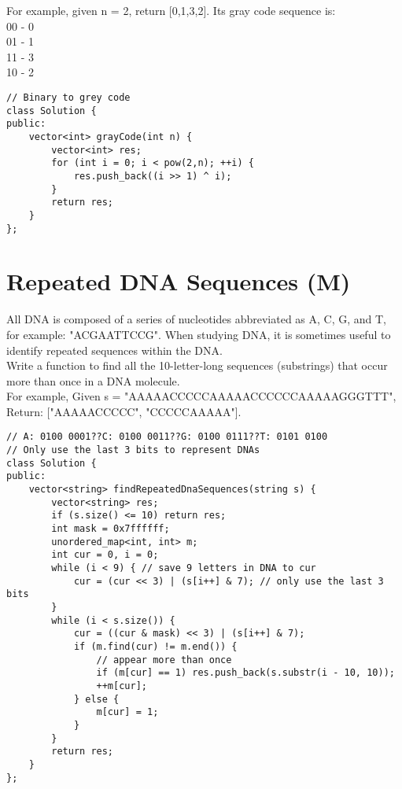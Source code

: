 For example, given n = 2, return [0,1,3,2]. Its gray code sequence is:\\
00 - 0\\
01 - 1\\
11 - 3\\
10 - 2\\

\begin{lstlisting}
// Binary to grey code
class Solution {
public:
    vector<int> grayCode(int n) {
        vector<int> res;
        for (int i = 0; i < pow(2,n); ++i) {
            res.push_back((i >> 1) ^ i);
        }
        return res;
    }
};
\end{lstlisting}


\section{Repeated DNA Sequences (M)}
All DNA is composed of a series of nucleotides abbreviated as A, C, G, and T, for example: "ACGAATTCCG". When studying DNA, it is sometimes useful to identify repeated sequences within the DNA.\\

Write a function to find all the 10-letter-long sequences (substrings) that occur more than once in a DNA molecule.\\

For example,
Given s = "AAAAACCCCCAAAAACCCCCCAAAAAGGGTTT",
Return: ["AAAAACCCCC", "CCCCCAAAAA"].\\

\begin{lstlisting}
// A: 0100 0001??C: 0100 0011??G: 0100 0111??T: 0101 0100
// Only use the last 3 bits to represent DNAs 
class Solution {
public:
    vector<string> findRepeatedDnaSequences(string s) {
        vector<string> res;
        if (s.size() <= 10) return res;
        int mask = 0x7ffffff;
        unordered_map<int, int> m;
        int cur = 0, i = 0;
        while (i < 9) { // save 9 letters in DNA to cur
            cur = (cur << 3) | (s[i++] & 7); // only use the last 3 bits
        }
        while (i < s.size()) {
            cur = ((cur & mask) << 3) | (s[i++] & 7);
            if (m.find(cur) != m.end()) {
                // appear more than once
                if (m[cur] == 1) res.push_back(s.substr(i - 10, 10));
                ++m[cur]; 
            } else {
                m[cur] = 1;
            }
        }
        return res;
    }
};
\end{lstlisting}


